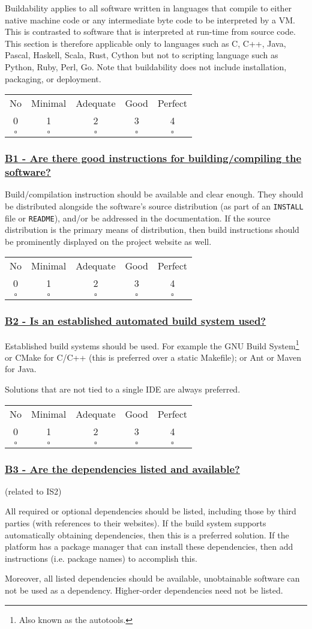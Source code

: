 \documentclass[a4paper,11pt]{article}
\newcommand{\criterion}[2]{\subsubsection*{\underline{#1 - #2}}\label{id:#1}}
\newcommand\CheckTable{%
  \begin{tabular}{ccccc}
    No & Minimal & Adequate & Good & Perfect \\
    0 & 1 & 2 & 3 & 4 \\
    \hline
    $\square$ & $\square$ & $\square$ & $\square$ & $\square$ \\
  \end{tabular}%
}
\begin{document}
Buildability applies to all software written in languages that compile to
either native machine code or any intermediate byte code to be interpreted by a VM.
This is contrasted to software that is interpreted at run-time from source
code. This section is therefore applicable only to languages such as C, C++,
Java, Pascal, Haskell, Scala, Rust, Cython but not to scripting language such
as Python, Ruby, Perl, Go.  Note that buildability does not include
installation, packaging, or deployment.

\CheckTable

\newcommand{\bOneID}{B1}
\newcommand{\bOneText}{Are there good instructions for building/compiling the software?}
\criterion{\bOneID}{\bOneText}

Build/compilation instruction should be available and clear enough. They should
be distributed alongside the software's source distribution (as part of an
\texttt{INSTALL} file or \texttt{README}), and/or be addressed in the documentation. If the
source distribution is the primary means of distribution, then build
instructions should be prominently displayed on the project website as well.

\CheckTable

\newcommand{\bTwoID}{B2}
\newcommand{\bTwoText}{Is an established automated build system used?}
\criterion{\bTwoID}{\bTwoText}

Established build systems should be used. For example the GNU Build
System\footnote{Also known as the autotools.} or CMake for C/C++ (this is
preferred over a static Makefile); or Ant or Maven for Java. 

Solutions that are not tied to a single IDE are always preferred.

\CheckTable

\newcommand{\bThreeID}{B3}
\newcommand{\bThreeText}{Are the dependencies listed and available?}
\criterion{\bThreeID}{\bThreeText}
(related to IS2)

All required or optional dependencies should be listed, including those by
third parties (with references to their websites). If the build system supports
automatically obtaining dependencies, then this is a preferred solution. If the
platform has a package manager that can install these dependencies, then add
instructions (i.e. package names) to accomplish this.

Moreover, all listed dependencies should be available, unobtainable software
can not be used as a dependency. Higher-order dependencies need not be listed.
\end{document}
